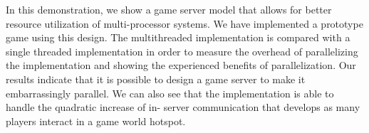 In this demonstration, we show a game server model that allows for better
resource utilization of multi-processor systems. We have implemented a prototype
game using this design. The multithreaded implementation is compared with a
single threaded implementation in order to measure the overhead of parallelizing
the implementation and showing the experienced benefits of parallelization. Our
results indicate that it is possible to design a game server to make it
embarrassingly parallel. We can also see that the implementation is able to
handle the quadratic increase of in- server communication that develops as many
players interact in a game world hotspot.




